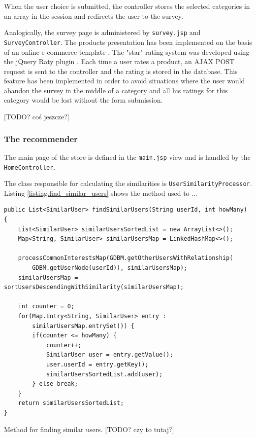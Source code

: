 \documentclass[12pt]{report}
\begin{document}
When the user choice is submitted, the controller stores the selected categories in an array in the session and redirects the user to the survey.

\hbox{}
Analogically, the survey page is administered by \texttt{survey\-.jsp} and \texttt{Survey\-Controller}. The products presentation has been implemented on the basis of an online e-commerce template \cite{bootply_ecommerce}. The "star" rating system was developed using the jQuery Raty plugin \cite{jquery_raty}. Each time a user rates a product, an AJAX POST request is sent to the controller and the rating is stored in the database. This feature has been implemented in order to avoid situations where the user would abandon the survey in the middle of a category and all his ratings for this category would be lost without the form submission.

[TODO? coś jeszcze?]

\subsubsection{The recommender}

The main page of the store is defined in the \texttt{main\-.jsp} view and is handled by the \texttt{HomeController}.

The class responsible for calculating the similarities is \texttt{User\-Similarity\-Processor}. Listing \ref{listing.find_similar_users} shows the method used to ...

\begin{listing}
\begin{verbatim}
public List<SimilarUser> findSimilarUsers(String userId, int howMany) {
    List<SimilarUser> similarUsersSortedList = new ArrayList<>();
    Map<String, SimilarUser> similarUsersMap = LinkedHashMap<>();

    processCommonInterestsMap(GDBM.getOtherUsersWithRelationship(
        GDBM.getUserNode(userId)), similarUsersMap);
    similarUsersMap = sortUsersDescendingWithSimilarity(similarUsersMap);

    int counter = 0;
    for(Map.Entry<String, SimilarUser> entry : 
        similarUsersMap.entrySet()) {
        if(counter <= howMany) {
            counter++;
            SimilarUser user = entry.getValue();
            user.userId = entry.getKey();
            similarUsersSortedList.add(user);
        } else break;
    }
    return similarUsersSortedList;
}
\end{verbatim}
\caption{Method for finding similar users. [TODO? czy to tutaj?]}
\label{listing.find_similar_users}
\end{listing}
\end{document}
